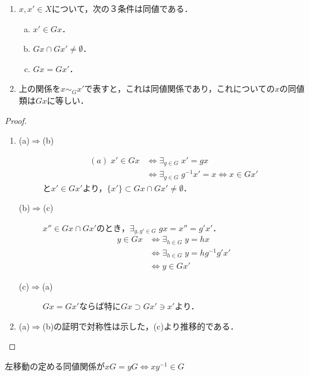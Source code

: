 \documentclass[uplatex,dvipdfmx]{jsreport}
\begin{document}
\begin{lemma}\label{lemma-quotient-welldifinedness}\mbox{}
    \begin{enumerate}
        \item $x,x'\in X$について，次の３条件は同値である．\begin{enumerate}[(a)]
            \item $x'\in Gx$．
            \item $Gx\cap Gx'\ne\emptyset$．
            \item $Gx=Gx'$．
        \end{enumerate}
        \item 上の関係を$x\sim_Gx'$で表すと，これは同値関係であり，これについての$x$の同値類は$Gx$に等しい．
    \end{enumerate}
\end{lemma}
\begin{proof}\mbox{}
    \begin{enumerate}
        \item \begin{description}
            \item[(a)$\Rightarrow$(b)] \begin{align*}
                (a)\;x'\in Gx&\Leftrightarrow \exists_{g\in G}\;x'=gx\\
                &\Leftrightarrow \exists_{g\in G}\;g^{-1}x'=x\Leftrightarrow x\in Gx'
            \end{align*}
            と$x'\in Gx'$より，$\{x'\}\subset Gx\cap Gx'\ne\emptyset$．
            \item[(b)$\Rightarrow$(c)] $x''\in Gx\cap Gx'$のとき，$\exists_{g,g'\in G}\;gx=x''=g'x'$．
            \begin{align*}
                y\in Gx&\Leftrightarrow \exists_{h\in G}\;y=hx\\
                &\Leftrightarrow \exists_{h\in G}\;y=hg^{-1}g'x'\\
                &\Leftrightarrow y\in Gx'
            \end{align*}
            \item[(c)$\Rightarrow$(a)] $Gx=Gx'$ならば特に$Gx\supset Gx'\ni x'$より．
        \end{description}
        \item (a)$\Rightarrow$(b)の証明で対称性は示した，(c)より推移的である．
    \end{enumerate}
\end{proof}
\begin{remarks}\label{remarks-軌道の特徴付け}
    左移動の定める同値関係が$xG=yG\Leftrightarrow xy^{-1}\in G$
\end{remarks}
\end{document}
